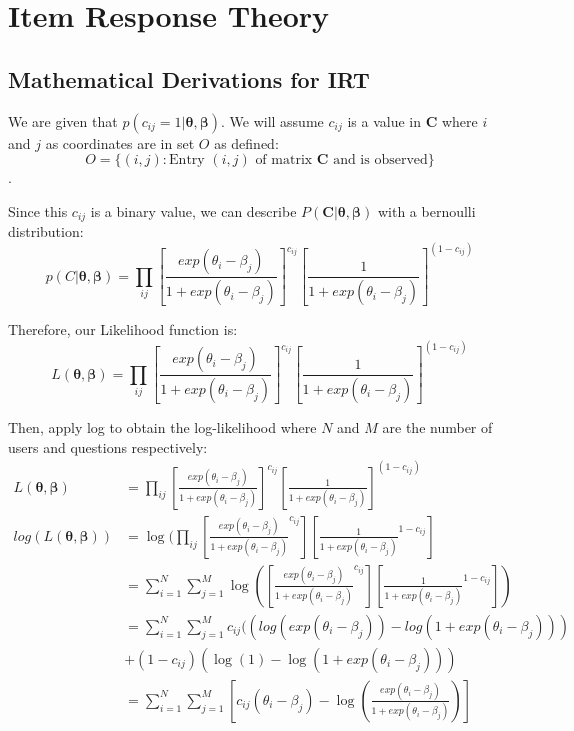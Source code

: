 \documentclass{article}
\begin{document}
    
    \pagebreak

    \section{Item Response Theory}
    \subsection{Mathematical Derivations for IRT}
    We are given that $p(c_{ij} = 1 \vert \bm{\theta}, \bm{\beta})$. We will assume $c_{ij}$ is a value in $\bm{C}$ where $i$ and $j$ as coordinates are in set $O$ as defined:
    \[ O = \{(i,j): \text{Entry $(i,j)$ of matrix $\bm{C}$ and is observed}\} \].

    Since this $c_{ij}$ is a binary value, we can describe $P(\bm{C} \vert \bm{\theta}, \bm{\beta})$ with a bernoulli distribution:
    \[p(C \vert \bm{\theta}, \bm{\beta}) = \prod_{ij}[\frac{exp(\theta_{i} - \beta_{j})}{1+exp(\theta_{i} - \beta_{j})}]^{c_{ij}}[\frac{1}{1 + exp(\theta_{i} - \beta_{j})}]^{(1-c_{ij})}\]

    Therefore, our Likelihood function is:
    \[L(\bm{\theta}, \bm{\beta}) =\prod_{ij}[\frac{exp(\theta_{i} - \beta_{j})}{1+exp(\theta_{i} - \beta_{j})}]^{c_{ij}}[\frac{1}{1 + exp(\theta_{i} - \beta_{j})}]^{(1-c_{ij})}\]

    Then, apply log to obtain the log-likelihood where $N$ and $M$ are the number of users and questions respectively:
    \begin{align*}
        L(\bm{\theta}, \bm{\beta}) &=\prod_{ij}[\frac{exp(\theta_{i} - \beta_{j})}{1+exp(\theta_{i} - \beta_{j})}]^{c_{ij}}[\frac{1}{1 + exp(\theta_{i} - \beta_{j})}]^{(1-c_{ij})} \\
        log(L(\bm{\theta}, \bm{\beta})) &= \log(\prod_{ij}[\frac{exp(\theta_{i} - \beta_{j})}{1+exp(\theta_{i} - \beta_{j})}^{c_{ij}}][\frac{1}{1 + exp(\theta_{i} - \beta_{j})}^{1-c_{ij}}] \\
        &=\sum_{i=1}^{N} \sum_{j=1}^{M} \log([\frac{exp(\theta_{i} - \beta_{j})}{1+exp(\theta_{i} - \beta_{j})}^{c_{ij}}][\frac{1}{1 + exp(\theta_{i} - \beta_{j})}^{1-c_{ij}}]) \\
        &=\sum_{i=1}^{N} \sum_{j=1}^{M} c_{ij}((log(exp(\theta_{i} - \beta_{j})) - log(1 + exp(\theta_{i} - \beta_{j}))) \\
        &+ (1 - c_{ij})(\log(1) - \log(1 + exp(\theta_{i} - \beta_{j}))) \\
        &=\sum_{i=1}^{N} \sum_{j=1}^{M} [c_{ij}(\theta_{i} - \beta_{j}) - \log(\frac{exp(\theta_{i} - \beta_{j})}{1+exp(\theta_{i} - \beta_{j})})] \\
    \end{align*}
\end{document}
